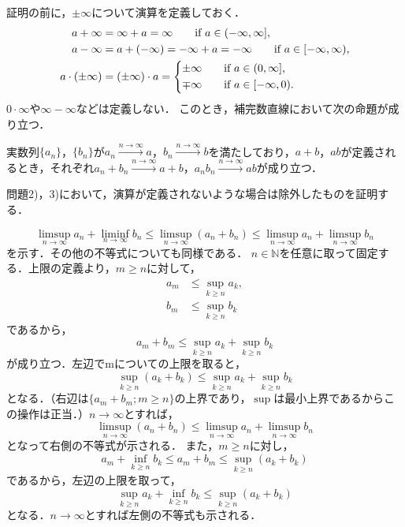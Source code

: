 証明の前に，$\pm \infty$について演算を定義しておく．
\begin{align*}
    a + \infty           & = \infty + a = \infty \qquad \text{if $a \in (-\infty,\infty]$},                   \\
    a - \infty           & = a + (-\infty) = -\infty + a = -\infty \qquad \text{if $a \in [-\infty,\infty)$}, \\
    a \cdot (\pm \infty) & = (\pm \infty) \cdot a =
    \begin{cases*}
        \pm \infty \quad & if $a \in (0,\infty]$,  \\
        \mp \infty \quad & if $a \in [-\infty,0)$.
    \end{cases*}
\end{align*}
$0 \cdot \infty$や$\infty - \infty$などは定義しない．
このとき，補完数直線において次の命題が成り立つ．
\begin{lemma}{}{}
    実数列$\{a_n\}$，$\{b_n\}$が$a_n \xrightarrow{n \to \infty} a$，$b_n \xrightarrow{n \to \infty} b$を満たしており，$a+b$，$ab$が定義されるとき，それぞれ$a_n + b_n \xrightarrow{n \to \infty} a+b$，$a_n b_n \xrightarrow{n \to \infty} ab$が成り立つ．
\end{lemma}
問題2)，3)において，演算が定義されないような場合は除外したものを証明する．


\begin{tproof}
    \[
        \limsup _{n \to \infty} a_n + \liminf _{n \to \infty} b_n \leq \limsup _{n \to \infty} (a_n + b_n) \leq \limsup _{n \to \infty} a_n + \limsup _{n \to \infty} b_n
    \]
    を示す．その他の不等式についても同様である．
    $n \in \mathbb{N}$を任意に取って固定する．上限の定義より，$m \geq n$に対して，
    \begin{align*}
        a_m & \leq \sup _{k \geq n} a_k, \\
        b_m & \leq \sup _{k \geq n} b_k
    \end{align*}
    であるから，
    \[
        a_m + b_m \leq \sup _{k \geq n} a_k + \sup _{k \geq n} b_k
    \]
    が成り立つ．左辺でmについての上限を取ると，
    \[
        \sup _{k \geq n} (a_k + b_k) \leq \sup _{k \geq n} a_k + \sup _{k \geq n} b_k
    \]
    となる．（右辺は$\{a_m + b_m; m \geq n\}$の上界であり，$\sup$は最小上界であるからこの操作は正当．）$n \to \infty$とすれば，
    \[
        \limsup _{n \to \infty} (a_n + b_n) \leq \limsup _{n \to \infty} a_n + \limsup _{n \to \infty} b_n
    \]
    となって右側の不等式が示される．
    また，$m \geq n$に対し，
    \[
        a_m + \inf _{k \geq n} b_k \leq a_m + b_m \leq \sup _{k \geq n} (a_k + b_k)
    \]
    であるから，左辺の上限を取って，
    \[
        \sup _{k \geq n} a_k + \inf _{k \geq n} b_k \leq \sup _{k \geq n} (a_k + b_k)
    \]
    となる．$n \to \infty$とすれば左側の不等式も示される．
\end{tproof}

